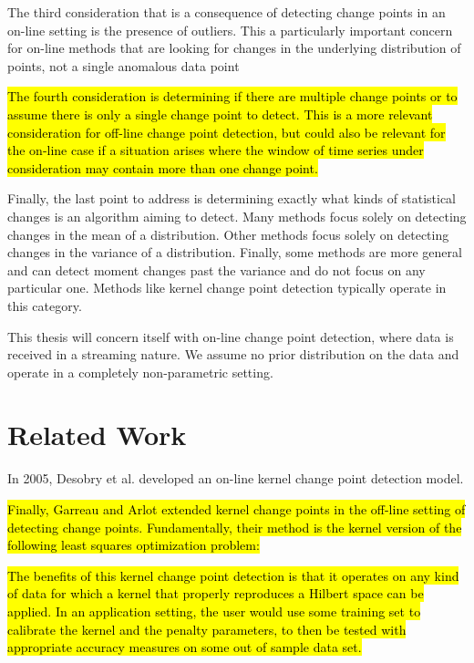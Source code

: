 The third consideration that is a consequence of detecting change points in an on-line setting is the presence of outliers. This a particularly important concern for on-line methods that are looking for changes in the underlying distribution of points, not a single anomalous data point

\hl{The fourth consideration is determining if there are multiple change points or to assume there is only a single change point to detect. This is a more relevant consideration for off-line change point detection, but could also be relevant for the on-line case if a situation arises where the window of time series under consideration may contain more than one change point.}

Finally, the last point to address is determining exactly what kinds of statistical changes is an algorithm aiming to detect. Many methods focus solely on detecting changes in the mean of a distribution. Other methods focus solely on detecting changes in the variance of a distribution. Finally, some methods are more general and can detect moment changes past the variance and do not focus on any particular one. Methods like kernel change point detection typically operate in this category. 

This thesis will concern itself with on-line change point detection, where data is received in a streaming nature. We assume no prior distribution on the data and operate in a completely non-parametric setting. 
\section{Related Work}

In 2005, Desobry et al. \cite{desobry2005online} developed an on-line kernel change point detection model.




\hl{Finally, Garreau and Arlot extended kernel change points  in the off-line setting of detecting change points. Fundamentally, their method is the kernel version of the following least squares optimization problem:}


\hl{The benefits of this kernel change point detection is that it operates on any kind of data for which a kernel that properly reproduces a Hilbert space can be applied.  %
In an application setting, the user would use some training set to calibrate the kernel and the penalty parameters, to then be tested with appropriate accuracy measures on some out of sample data set.}


